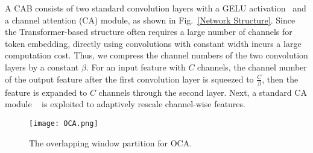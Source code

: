 \documentclass[10pt,twocolumn,letterpaper]{article}
\begin{document}
A CAB consists of two standard convolution layers with a GELU activation~\cite{GELU} and a channel attention (CA) module, as shown in Fig.~\ref{Network Structure}. Since the Transformer-based structure often requires a large number of channels for token embedding, directly using convolutions with constant width incurs a large computation cost. Thus, we compress the channel numbers of the two convolution layers by a constant $\beta$. For an input feature with $C$ channels, the channel number of the output feature after the first convolution layer is squeezed to $\frac{C}{\beta}$, then the feature is expanded to $C$ channels through the second layer. Next, a standard CA module ~\cite{rcan} is exploited to adaptively rescale channel-wise features. 




\begin{figure}[!t]
\centering
\texttt{[image: OCA.png]}
\vspace{-0.3cm}
\caption{The overlapping window partition for OCA.}
\vspace{-0.5cm}
\label{OCA}
\end{figure}
\end{document}
